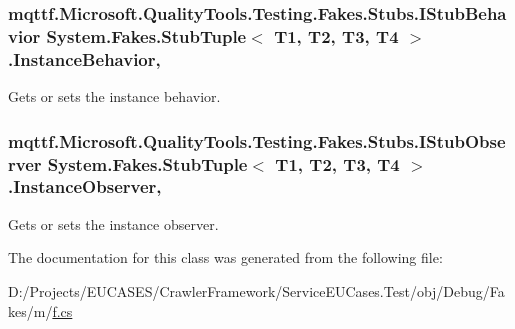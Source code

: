 \hypertarget{class_system_1_1_fakes_1_1_stub_tuple_3_01_t1_00_01_t2_00_01_t3_00_01_t4_01_4_aba9bf62051416efe1b2fa2a00cf8a049}{
\subsubsection[{Instance\-Behavior}]{\setlength{\rightskip}{0pt plus 5cm}mqttf.\-Microsoft.\-Quality\-Tools.\-Testing.\-Fakes.\-Stubs.\-I\-Stub\-Behavior System.\-Fakes.\-Stub\-Tuple$<$ T1, T2, T3, T4 $>$.Instance\-Behavior\hspace{0.3cm}{\ttfamily [get]}, {\ttfamily [set]}}}\label{class_system_1_1_fakes_1_1_stub_tuple_3_01_t1_00_01_t2_00_01_t3_00_01_t4_01_4_aba9bf62051416efe1b2fa2a00cf8a049}


Gets or sets the instance behavior.

\hypertarget{class_system_1_1_fakes_1_1_stub_tuple_3_01_t1_00_01_t2_00_01_t3_00_01_t4_01_4_af3403b1d915f4e8e07014c7e2725d5da}{
\subsubsection[{Instance\-Observer}]{\setlength{\rightskip}{0pt plus 5cm}mqttf.\-Microsoft.\-Quality\-Tools.\-Testing.\-Fakes.\-Stubs.\-I\-Stub\-Observer System.\-Fakes.\-Stub\-Tuple$<$ T1, T2, T3, T4 $>$.Instance\-Observer\hspace{0.3cm}{\ttfamily [get]}, {\ttfamily [set]}}}\label{class_system_1_1_fakes_1_1_stub_tuple_3_01_t1_00_01_t2_00_01_t3_00_01_t4_01_4_af3403b1d915f4e8e07014c7e2725d5da}


Gets or sets the instance observer.



The documentation for this class was generated from the following file\-:\begin{DoxyCompactItemize}
\item 
D\-:/\-Projects/\-E\-U\-C\-A\-S\-E\-S/\-Crawler\-Framework/\-Service\-E\-U\-Cases.\-Test/obj/\-Debug/\-Fakes/m/\hyperlink{m_2f_8cs}{f.\-cs}\end{DoxyCompactItemize}
